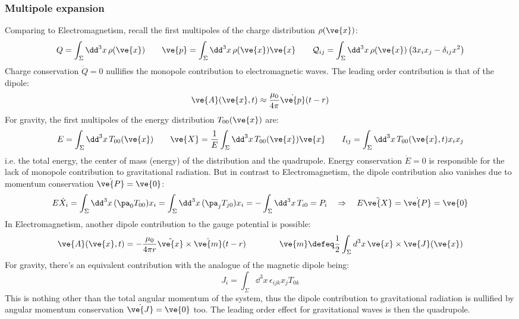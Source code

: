 \subsubsection{Multipole expansion}

Comparing to Electromagnetism, recall the first multipoles of the charge distribution $ \rho(\ve{x}) $:
\begin{equation*}
  Q = \int_\Sigma \dd^3 x\, \rho(\ve{x})
  \qquad
  \ve{p} = \int_\Sigma \dd^3 x\, \rho(\ve{x}) \ve{x}
  \qquad
  \mathcal{Q}_{ij} = \int_\Sigma \dd^3 x\, \rho(\ve{x}) \left( 3 x_i x_j - \delta_{ij} x^2 \right)
\end{equation*}
Charge conservation $ \dot{Q} = 0 $ nullifies the monopole contribution to electromagnetic waves. The leading order contribution is that of the dipole:
\begin{equation*}
  \ve{A}(\ve{x},t) \approx \frac{\mu_0}{4\pi} \dot{\ve{p}}(t - r)
\end{equation*}
For gravity, the first multipoles of the energy distribution $ T_{00}(\ve{x}) $ are:
\begin{equation*}
  E = \int_\Sigma \dd^3 x\, T_{00}(\ve{x})
  \qquad
  \ve{X} = \frac{1}{E} \int_\Sigma \dd^3 x\, T_{00}(\ve{x}) \ve{x}
  \qquad
  I_{ij} = \int_\Sigma \dd^3 x\, T_{00}(\ve{x},t) x_i x_j
\end{equation*}
i.e. the total energy, the center of mass (energy) of the distribution and the quadrupole. Energy conservation $ \dot{E} = 0 $ is responsible for the lack of monopole contribution to gravitational radiation. But in contrast to Electromagnetism, the dipole contribution also vanishes due to momentum conservation $ \dot{\ve{P}} = \ve{0} $:
\begin{equation*}
  E \dot{X}_i = \int_\Sigma \dd^3 x\, (\pa_0 T_{00}) x_i = \int_\Sigma \dd^3 x\, (\pa_j T_{j0}) x_i = - \int_\Sigma \dd^3 x\, T_{i0} = P_i
  \quad \Rightarrow \quad
  E \ddot{\ve{X}} = \dot{\ve{P}} = \ve{0}
\end{equation*}
In Electromagnetism, another dipole contribution to the gauge potential is possible:
\begin{equation*}
  \ve{A}(\ve{x},t) = -\frac{\mu_0}{4\pi r} \hat{\ve{x}} \times \dot{\ve{m}}(t - r)
  \qquad \qquad
  \ve{m} \defeq \frac{1}{2} \int_\Sigma d^3 x\, \ve{x} \times \ve{J}(\ve{x})
\end{equation*}
For gravity, there's an equivalent contribution with the analogue of the magnetic dipole being:
\begin{equation*}
  J_i = \int_\Sigma \dd^3 x\, \epsilon_{ijk} x_j T_{0k}
\end{equation*}
This is nothing other than the total angular momentum of the system, thus the dipole contribution to gravitational radiation is nullified by angular momentum conservation $ \dot{\ve{J}} = \ve{0} $ too. The leading order effect for gravitational waves is then the quadrupole.

